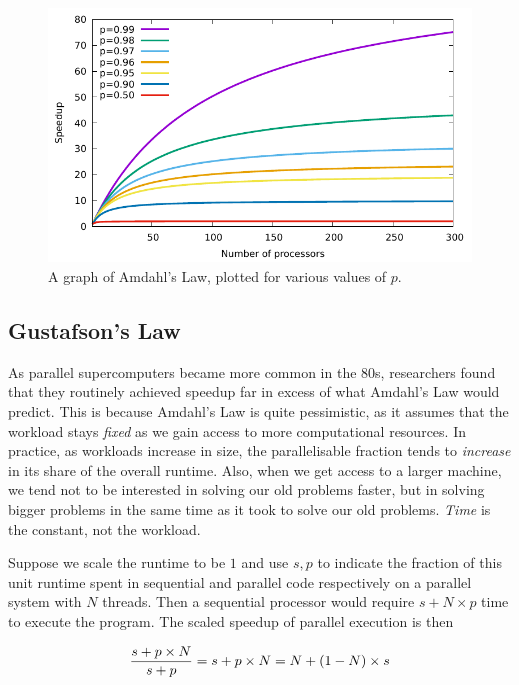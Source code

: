 \begin{figure}
  \centering
  \includegraphics[width=\textwidth]{img/amdahl.pdf}
  \caption{A graph of Amdahl's Law, plotted for various values of $p$.}
  \label{fig:amdahl}
\end{figure}

\subsection{Gustafson's Law}
\label{sec:gustafson}

As parallel supercomputers became more common in the 80s, researchers
found that they routinely achieved speedup far in excess of what
Amdahl's Law would predict.  This is because Amdahl's Law is quite
pessimistic, as it assumes that the workload stays \emph{fixed} as we
gain access to more computational resources.  In practice, as
workloads increase in size, the parallelisable fraction tends to
\emph{increase} in its share of the overall runtime.  Also, when we
get access to a larger machine, we tend not to be interested in
solving our old problems faster, but in solving bigger problems in the
same time as it took to solve our old problems.  \emph{Time} is the
constant, not the workload.

Suppose we scale the runtime to be $1$ and use $s,p$ to indicate the
fraction of this unit runtime spent in sequential and parallel code
respectively on a parallel system with $N$ threads.  Then a sequential
processor would require $s+N\times{}p$ time to execute the program.
The scaled speedup of parallel execution is then

\begin{equation*}
  \frac{s+p\times N}{s+p} \\
  = s+p\times N \\
  = N + (1-N) \times s
\end{equation*}

